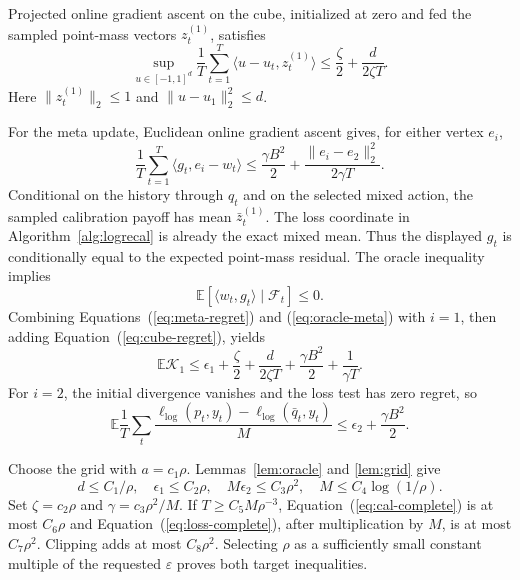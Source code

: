 \documentclass{article}
\newcommand{\calK}{\mathcal{K}}
\begin{document}
Projected online gradient ascent on the cube, initialized at zero and fed the sampled point-mass vectors $z_t^{(1)}$, satisfies
\begin{equation}
 \sup_{u\in[-1,1]^d}
 \frac1T\sum_{t=1}^T
 \langle u-u_t,z_t^{(1)}\rangle
 \leq\frac{\zeta}{2}+\frac{d}{2\zeta T}.
 \label{eq:cube-regret}
\end{equation}
Here $\|z_t^{(1)}\|_2\leq1$ and $\|u-u_1\|_2^2\leq d$.

For the meta update, Euclidean online gradient ascent gives, for either vertex $e_i$,
\begin{equation}
 \frac1T\sum_{t=1}^T\langle g_t,e_i-w_t\rangle
 \leq\frac{\gamma B^2}{2}
 +\frac{\|e_i-e_2\|_2^2}{2\gamma T}.
 \label{eq:meta-regret}
\end{equation}
Conditional on the history through $q_t$ and on the selected mixed action, the sampled calibration payoff has mean $\bar z_t^{(1)}$. The loss coordinate in Algorithm~\ref{alg:logrecal} is already the exact mixed mean. Thus the displayed $g_t$ is conditionally equal to the expected point-mass residual. The oracle inequality implies
\begin{equation}
 \mathbb{E}[\langle w_t,g_t\rangle\mid\mathcal F_t]\leq0.
 \label{eq:oracle-meta}
\end{equation}
Combining Equations~(\ref{eq:meta-regret}) and (\ref{eq:oracle-meta}) with $i=1$, then adding Equation~(\ref{eq:cube-regret}), yields
\begin{equation}
 \mathbb{E}\calK_1
 \leq\epsilon_1+\frac{\zeta}{2}
 +\frac{d}{2\zeta T}
 +\frac{\gamma B^2}{2}+\frac1{\gamma T}.
 \label{eq:cal-complete}
\end{equation}
For $i=2$, the initial divergence vanishes and the loss test has zero regret, so
\begin{equation}
 \mathbb{E}\frac1T\sum_t
 \frac{\ell_{\log}(p_t,y_t)-\ell_{\log}(\bar q_t,y_t)}M
 \leq\epsilon_2+\frac{\gamma B^2}{2}.
 \label{eq:loss-complete}
\end{equation}

Choose the grid with $a=c_1\rho$. Lemmas~\ref{lem:oracle} and \ref{lem:grid} give \[ d\leq C_1/\rho,\quad \epsilon_1\leq C_2\rho,\quad M\epsilon_2\leq C_3\rho^2,\quad M\leq C_4\log(1/\rho). \] Set $\zeta=c_2\rho$ and $\gamma=c_3\rho^2/M$. If $T\geq C_5M\rho^{-3}$, Equation~(\ref{eq:cal-complete}) is at most $C_6\rho$ and Equation~(\ref{eq:loss-complete}), after multiplication by $M$, is at most $C_7\rho^2$. Clipping adds at most $C_8\rho^2$. Selecting $\rho$ as a sufficiently small constant multiple of the requested $\varepsilon$ proves both target inequalities.
\end{document}
